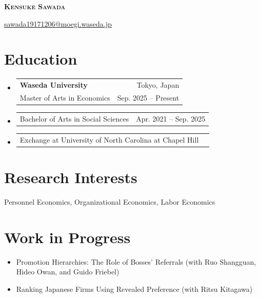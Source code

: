\documentclass[letterpaper,11pt]{article}
\makeatletter
\newcommand{\resumeSubheading}[4]{
  \vspace{-2pt}\item
    \begin{tabular*}{0.97\textwidth}[t]{l@{\extracolsep{\fill}}r}
      \expandafter#1 & {\small #2} \\
      {\small#3} & {\small #4} \\
    \end{tabular*}\vspace{-7pt}
}
\newcommand{\resumeSubSubheading}[2]{
    \item
    \begin{tabular*}{0.97\textwidth}{l@{\extracolsep{\fill}}r}
      {\small#1} & {\small #2} \\
    \end{tabular*}\vspace{-7pt}
}
\newcommand{\resumeSubHeadingListStart}{\begin{itemize}[leftmargin=0.15in, label={}]}
\newcommand{\resumeSubHeadingListEnd}{\end{itemize}}
\newcommand{\resumePublication}[1]{
  \item\small{
    #1 \vspace{-2pt}
  }
}
\makeatother
\begin{document}
\begin{center}
    \textbf{\huge \scshape Kensuke Sawada}
\end{center}

\begin{center}
\href{mailto:sawada19171206@moegi.waseda.jp}{\underline{sawada19171206@moegi.waseda.jp}}
\end{center}

\section{Education}
  \resumeSubHeadingListStart
    \resumeSubheading
      {\textbf{Waseda University}}{Tokyo, Japan}
      {Master of Arts in Economics}{Sep. 2025 -- Present}
    \resumeSubSubheading
      {Bachelor of Arts in Social Sciences}{Apr. 2021 -- Sep. 2025}
    \resumeSubSubheading
      {\hspace{1em}Exchange at University of North Carolina at Chapel Hill}{}
  \resumeSubHeadingListEnd

\section{Research Interests}
    \hspace{7pt}
    Personnel Economics, Organizational Economics, Labor Economics


\section{Work in Progress}
    \resumeSubHeadingListStart
      \resumePublication{Promotion Hierarchies: The Role of Bosses' Referrals (with Ruo Shangguan, Hideo Owan, and Guido Friebel)}
      \resumePublication{Ranking Japanese Firms Using Revealed Preference (with Ritsu Kitagawa)}
    \resumeSubHeadingListEnd
\end{document}
